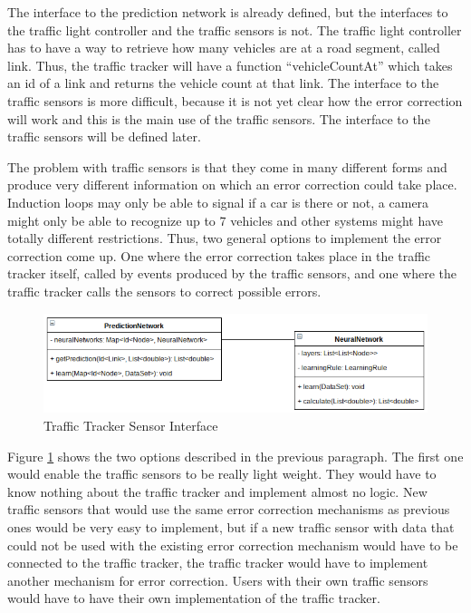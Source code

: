The interface to the prediction network is already defined, but the interfaces to the traffic light controller and the traffic sensors is not. The traffic light controller has to have a way to retrieve how many vehicles are at a road segment, called link. Thus, the traffic tracker will have a function ``vehicleCountAt'' which takes an id of a link and returns the vehicle count at that link. The interface to the traffic sensors is more difficult, because it is not yet clear how the error correction will work and this is the main use of the traffic sensors. The interface to the traffic sensors will be defined later.

The problem with traffic sensors is that they come in many different forms and produce very different information on which an error correction could take place. Induction loops may only be able to signal if a car is there or not, a camera might only be able to recognize up to 7 vehicles and other systems might have totally different restrictions. Thus, two general options to implement the error correction come up. One where the error correction takes place in the traffic tracker itself, called by events produced by the traffic sensors, and one where the traffic tracker calls the sensors to correct possible errors. 

\begin{figure}[!ht]
  \centering
  \includegraphics[width=16cm]{figures/predictionNetwork}
  \caption[Traffic Tracker Sensor Interface]{Traffic Tracker Sensor Interface \protect\footnotemark}
  \label{trafficTrackerSensorInterface}
\end{figure}

Figure \ref{trafficTrackerSensorInterface} shows the two options described in the previous paragraph. The first one would enable the traffic sensors to be really light weight. They would have to know nothing about the traffic tracker and implement almost no logic. New traffic sensors that would use the same error correction mechanisms as previous ones would be very easy to implement, but if a new traffic sensor with data that could not be used with the existing error correction mechanism would have to be connected to the traffic tracker, the traffic tracker would have to implement another mechanism for error correction. Users with their own traffic sensors would have to have their own implementation of the traffic tracker.

